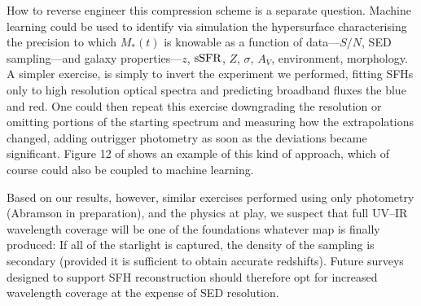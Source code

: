 \documentclass[a4paper,fleqn,usenatbib]{mnras}
\newcommand{\Mstel}{M_\ast}
\newcommand{\bfr}{\bf\color{red}}
\newcommand{\ssfr}{{\rm sSFR}}
\begin{document}
How to reverse engineer this compression scheme is a separate question. Machine learning 
could be used to identify via simulation the hypersurface characterising the precision to which 
$\Mstel(t)$ is knowable as a function of data---$S/N$, SED sampling---and galaxy 
properties---$z$, $\ssfr$, $Z$, $\sigma$, $A_{V}$, environment, morphology. A simpler exercise,
is simply to invert the experiment we performed, fitting SFHs only to high resolution optical 
spectra and predicting broadband fluxes the blue and red. One could then repeat this exercise 
downgrading the resolution or omitting portions of the starting spectrum and measuring how 
the extrapolations changed, adding outrigger photometry as soon as the deviations became
significant. Figure 12 of \citet{Abramson20} shows an example of this kind of approach, 
which of course could also be coupled to machine learning.


Based on our results, however, similar exercises performed using only photometry 
(Abramson in preparation), and the physics at play, we suspect that full UV--IR 
wavelength coverage will be one of the foundations whatever map is finally produced: If all of 
the starlight is captured, the density of the sampling is secondary (provided it is sufficient
to obtain accurate redshifts). Future surveys designed to support SFH reconstruction should 
therefore opt for increased wavelength coverage at the expense of SED resolution. 



\end{document}
